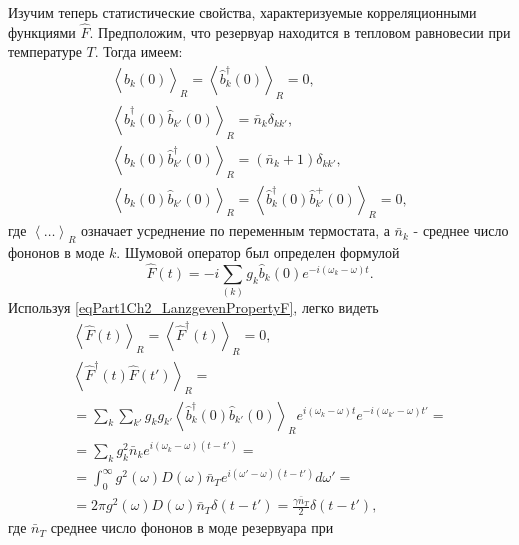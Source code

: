 Изучим теперь статистические свойства, характеризуемые корреляционными
функциями $\hat{F}$. Предположим, что резервуар находится в тепловом
равновесии при температуре $T$. Тогда имеем:
\begin{eqnarray}
\left<\hat{b}_k\left(0\right)\right>_R = 
\left<\hat{b}_k^{\dag}\left(0\right)\right>_R = 0, 
\nonumber \\
\left<\hat{b}_k^{\dag}\left(0\right)\hat{b}_{k'}\left(0\right)\right>_R = 
\bar{n}_k \delta_{k k'},
\nonumber \\
\left<\hat{b}_k\left(0\right)\hat{b}_{k'}^{\dag}\left(0\right)\right>_R = 
\left(\bar{n}_k + 1\right)\delta_{k k'},
\nonumber \\
\left<\hat{b}_k\left(0\right)\hat{b}_{k'}\left(0\right)\right>_R = 
\left<\hat{b}_k^{\dag}\left(0\right)\hat{b}_{k'}^{+}\left(0\right)\right>_R
= 0,
\label{eqPart1Ch2_LanzgevenPropertyF}
\end{eqnarray}
где $\left<\dots\right>_R$ означает усреднение по переменным
термостата, а $\bar{n}_k$ - среднее число фононов в моде $k$. Шумовой
оператор был определен формулой 
\begin{equation}
\hat{F}\left(t\right) = -i \sum_{(k)}g_k 
\hat{b}_k\left(0\right)
e^{-i \left(\omega_k - \omega\right)t}.
\label{eqPart1Ch2_LanzgevenDefenitionF}
\end{equation}
Используя \eqref{eqPart1Ch2_LanzgevenPropertyF}, легко видеть
\begin{eqnarray}
\left<\hat{F}\left(t\right)\right>_R =
\left<\hat{F}^{\dag}\left(t\right)\right>_R  = 0,
\nonumber \\
\left<\hat{F}^{\dag}\left(t\right)\hat{F}\left(t'\right)\right>_R = 
\nonumber \\
= \sum_{k}\sum_{k'}g_k g_{k'}
\left<\hat{b}_k^{\dag}\left(0\right)\hat{b}_{k'}\left(0\right)\right>_R 
e^{i\left(\omega_k - \omega\right)t} 
 e^{-i\left(\omega_{k'} - \omega\right)t'} =
\nonumber \\
= \sum_{k}g_k^2 \bar{n}_k 
e^{i\left(\omega_k - \omega\right)\left(t - t'\right)} = 
\nonumber \\
=
\int_0^\infty
g^2\left(\omega\right)D\left(\omega\right)\bar{n}_T
e^{i\left(\omega' - \omega\right)\left(t - t'\right)}d \omega' = 
\nonumber \\
= 2 \pi
g^2\left(\omega\right)D\left(\omega\right)\bar{n}_T
\delta\left(t - t'\right) =
\frac{\gamma \bar{n}_{T}}{2} \delta\left(t - t'\right),
\label{eqPart1Ch2_LanzgevenCorrelations}
\end{eqnarray}
где $\bar{n}_T$ среднее число фононов в моде резервуара при
